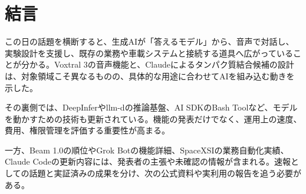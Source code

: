 \section*{結言}
この日の話題を横断すると、生成AIが「答えるモデル」から、音声で対話し、実験設計を支援し、既存の業務や車載システムと接続する道具へ広がっていることが分かる。Voxtral 3の音声機能と、Claudeによるタンパク質結合候補の設計は、対象領域こそ異なるものの、具体的な用途に合わせてAIを組み込む動きを示した。

その裏側では、DeepInferやllm-dの推論基盤、AI SDKのBash Toolなど、モデルを動かすための技術も更新されている。機能の発表だけでなく、運用上の速度、費用、権限管理を評価する重要性が高まる。

一方、Beam 1.0の順位やGrok Botの機能詳細、SpaceXSIの業務自動化実績、Claude Codeの更新内容には、発表者の主張や未確認の情報が含まれる。速報としての話題と実証済みの成果を分け、次の公式資料や実利用の報告を追う必要がある。
